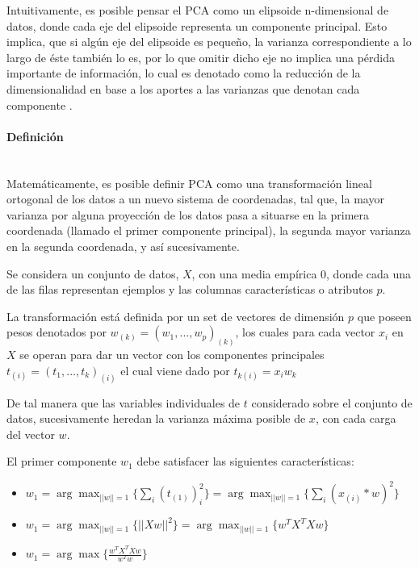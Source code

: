 Intuitivamente, es posible pensar el PCA como un elipsoide n-dimensional de datos, donde cada eje del elipsoide representa un componente principal. Esto implica, que si algún eje del elipsoide es pequeño, la varianza correspondiente a lo largo de éste también lo es, por lo que omitir dicho eje no implica una pérdida importante de información, lo cual es denotado como la reducción de la dimensionalidad en base a los aportes a las varianzas que denotan cada componente \cite{wold1987principal}.

\paragraph{Definición\\\\}

Matemáticamente, es posible definir PCA como una transformación lineal ortogonal de los datos a un nuevo sistema de coordenadas, tal que, la mayor varianza por alguna proyección de los datos pasa a situarse en la primera coordenada (llamado el primer componente principal), la segunda mayor varianza en la segunda coordenada, y así sucesivamente.

Se considera un conjunto de datos, $X$, con una media empírica 0, donde cada una de las filas  representan ejemplos y las columnas características o atributos $p$.

La transformación está definida por un set de vectores de dimensión $p$ que poseen pesos denotados por $ w_{(k)} = (w_{1},...,w_{p})_{(k)}$, los cuales para cada vector $x_{i}$ en $X$ se operan para dar un vector con los componentes principales $ t_{(i)} = (t_{1},...,t_{k})_{(i)}$ el cual viene dado por $ t_{k(i)} = x_{i}  w_{k}$

De tal manera que las variables individuales de $t$ considerado sobre el conjunto de datos, sucesivamente heredan la varianza máxima posible de $x$, con cada carga del vector $w$.

El primer componente $ w_{{1}} $ debe satisfacer las siguientes características:

\begin{itemize}
	
	\item $w_{1} = \arg \max_{||w||=1} \{\sum_{i}(t_{(1)})^{2}_{i}\} = \arg \max_{||w||=1} \{\sum_{i}(x_{(i)}*w)^{2}\}$
	
	\item $w_{1} = \arg \max_{||w||=1} \{||Xw||^{2}\} = \arg \max_{||w||=1} \{w^{T}X^{T}Xw\}$
	
	\item $w_{1} = \arg \max \{\frac{w^{T}X^{T}Xw}{w^{T}w}\}$
	
\end{itemize}

